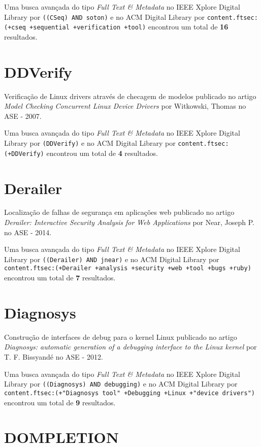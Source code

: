 Uma busca avançada do tipo {\it Full Text \& Metadata} no IEEE Xplore Digital Library por
\texttt{((CSeq) AND soton)}
e no ACM Digital Library por
\texttt{content.ftsec:(+cseq +sequential +verification +tool)}
encontrou um total de
{\bf 16}
resultados.

\section{DDVerify}

Verificação de Linux drivers através de checagem de modelos
publicado no artigo
{\it Model Checking Concurrent Linux Device Drivers}
por
Witkowski, Thomas
no
ASE
-
2007.


Uma busca avançada do tipo {\it Full Text \& Metadata} no IEEE Xplore Digital Library por
\texttt{(DDVerify)}
e no ACM Digital Library por
\texttt{content.ftsec:(+DDVerify)}
encontrou um total de
{\bf 4}
resultados.

\section{Derailer}

Localização de falhas de segurança em aplicações web
publicado no artigo
{\it Derailer: Interactive Security Analysis for Web Applications}
por
Near, Joseph P.
no
ASE
-
2014.


Uma busca avançada do tipo {\it Full Text \& Metadata} no IEEE Xplore Digital Library por
\texttt{((Derailer) AND jnear)}
e no ACM Digital Library por
\texttt{content.ftsec:(+Derailer +analysis +security +web +tool +bugs +ruby)}
encontrou um total de
{\bf 7}
resultados.

\section{Diagnosys}

Construção de interfaces de debug para o kernel Linux
publicado no artigo
{\it Diagnosys: automatic generation of a debugging interface to the Linux kernel}
por
T. F. Bissyandé
no
ASE
-
2012.


Uma busca avançada do tipo {\it Full Text \& Metadata} no IEEE Xplore Digital Library por
\texttt{((Diagnosys) AND debugging)}
e no ACM Digital Library por
\texttt{content.ftsec:(+"Diagnosys tool" +Debugging +Linux +"device drivers")}
encontrou um total de
{\bf 9}
resultados.

\section{DOMPLETION}

